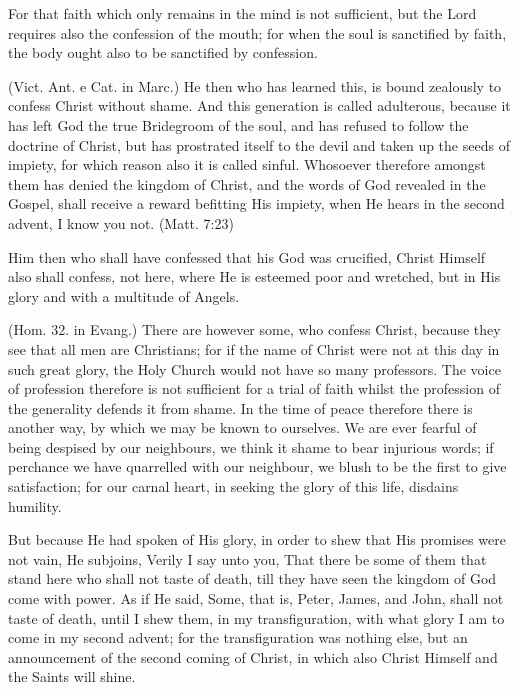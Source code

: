 For that faith which only remains in the mind is not sufficient, but the Lord requires also the confession of the mouth; for when the soul is sanctified by faith, the body ought also to be sanctified by confession.

 (Vict. Ant. e Cat. in Marc.) He then who has learned this, is bound zealously to confess Christ without shame. And this generation is called adulterous, because it has left God the true Bridegroom of the soul, and has refused to follow the doctrine of Christ, but has prostrated itself to the devil and taken up the seeds of impiety, for which reason also it is called sinful. Whosoever therefore amongst them has denied the kingdom of Christ, and the words of God revealed in the Gospel, shall receive a reward befitting His impiety, when He hears in the second advent, I know you not. (Matt. 7:23)

 Him then who shall have confessed that his God was crucified, Christ Himself also shall confess, not here, where He is esteemed poor and wretched, but in His glory and with a multitude of Angels.

 (Hom. 32. in Evang.) There are however some, who confess Christ, because they see that all men are Christians; for if the name of Christ were not at this day in such great glory, the Holy Church would not have so many professors. The voice of profession therefore is not sufficient for a trial of faith whilst the profession of the generality defends it from shame. In the time of peace therefore there is another way, by which we may be known to ourselves. We are ever fearful of being despised by our neighbours, we think it shame to bear injurious words; if perchance we have quarrelled with our neighbour, we blush to be the first to give satisfaction; for our carnal heart, in seeking the glory of this life, disdains humility.

 But because He had spoken of His glory, in order to shew that His promises were not vain, He subjoins, Verily I say unto you, That there be some of them that stand here who shall not taste of death, till they have seen the kingdom of God come with power. As if He said, Some, that is, Peter, James, and John, shall not taste of death, until I shew them, in my transfiguration, with what glory I am to come in my second advent; for the transfiguration was nothing else, but an announcement of the second coming of Christ, in which also Christ Himself and the Saints will shine.

